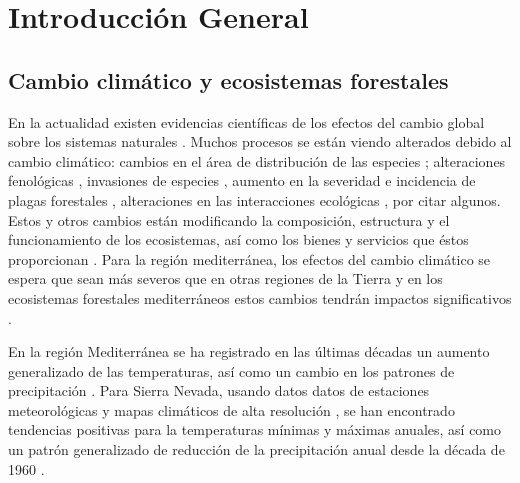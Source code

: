 %

\chapter{\textcolor{ctcolormain}{Introducción General}}\label{sec:intro}
\newpage

\section{Cambio climático y ecosistemas forestales}\label{sec:intro:climate-change}

En la actualidad existen evidencias científicas de los efectos del cambio global sobre los sistemas naturales \autocites{IPCC2013ClimateChange,HerreroZavala2015BosquesBiodiversidad}. Muchos procesos se están viendo alterados debido al cambio climático: cambios en el área de distribución de las especies \autocites{Thuilleretal2005ClimateChange}; alteraciones fenológicas \autocites{GordoSanz2005PhenologyClimate, EstiartePenuelas2015AlterationPhenology}, invasiones de especies \autocite{GonzalezMorenoetal14PlantInvasions}, aumento en la severidad e incidencia de plagas forestales \autocites{Hodaretal2012CambioClimatico,HodarZamora2004HerbivoryClimatic}, alteraciones en las interacciones ecológicas \autocites{MontoyaRaffaelli2010ClimateChange}, por citar algunos. Estos y otros cambios están modificando la composición, estructura y el funcionamiento de los ecosistemas, así como los bienes y servicios que éstos proporcionan \autocites{Dingetal2016ValuingClimate}. Para la región mediterránea, los efectos del cambio climático se espera que sean más severos que en otras regiones de la Tierra \autocites{Giorgi2006ClimateChange,IPCC2013ClimateChange} y en los ecosistemas forestales mediterráneos estos cambios tendrán impactos significativos \autocites{Regato2008AdaptingGlobal,RescodeDiosetal2006ClimateChange,Penuelasetal2017ImpactsGlobal,HerreroZavala2015BosquesBiodiversidad}.  

En la región Mediterránea se ha registrado en las últimas décadas un aumento generalizado de las temperaturas, así como un cambio en los patrones de precipitación \autocites{PerezBoscolo2010ClimateSpain,GiorgiLionello2008ClimateChange,Crameretal2020ClimateEnvironmental}. Para Sierra Nevada, usando datos datos de estaciones meteorológicas y mapas climáticos de alta resolución \autocites{Benitoetal2012SimulacionesClimaticas}, se han encontrado tendencias positivas para la temperaturas mínimas y máximas anuales, así como un patrón generalizado de reducción de la precipitación anual desde la década de 1960 \autocites{PerezLuqueetal2016SenalesCambio,PerezLuqueetal2021ClimaNevadaBase}.  

